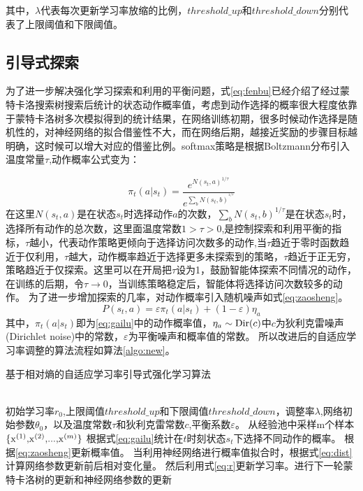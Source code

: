 其中，$\lambda$代表每次更新学习率放缩的比例，$threshold\_up$和$threshold\_down$分别代表了上限阈值和下限阈值。

\subsection{引导式探索}

为了进一步解决强化学习探索和利用的平衡问题，式\ref{eq:fenbu}已经介绍了经过蒙特卡洛搜索树搜索后统计的状态动作概率值，考虑到动作选择的概率很大程度依靠于蒙特卡洛树多次模拟得到的统计结果，在网络训练初期，很多时候动作选择是随机性的，对神经网络的拟合借鉴性不大，而在网络后期，越接近奖励的步骤目标越明确，这时候可以增大对应的借鉴比例。softmax策略是根据Boltzmann分布引入温度常量$\tau $,动作概率公式变为：

\begin{equation}
\label{eq:gailu}
{\pi _t}(a|{s_t}) = \frac{{{e^{N{{({s_t},a)}^{1/\tau }}}}}}{{{e^{\sum\nolimits_b {N{{({s_t},b)}^{^{1/\tau }}}} }}}}
\end{equation}
在这里${N({s_t},a)}$是在状态$s_t$时选择动作$a$的次数，${\sum\nolimits_b {N{{({s_t},b)}^{1/\tau }}} }$是在状态$s_t$时，选择所有动作的总次数，这里面温度常数$1>\tau>0$,是控制探索和利用平衡的指标，$\tau$越小，代表动作策略更倾向于选择访问次数多的动作,当$\tau$趋近于零时函数趋近于仅利用，$\tau$越大，动作概率趋近于选择更多未探索到的策略，$\tau$趋近于正无穷，策略趋近于仅探索。这里可以在开局把$\tau$设为1，鼓励智能体探索不同情况的动作，在训练的后期，令$\tau  \to 0$，当训练策略稳定后，智能体将选择访问次数较多的动作。
为了进一步增加探索的几率，对动作概率引入随机噪声如式\ref{eq:zaosheng}。
\begin{equation}
\label{eq:zaosheng}
	P({s_t},a) = \varepsilon{\pi _t}(a|{s_t}) + (1-\varepsilon) {\eta _a}
\end{equation}
其中，${\pi _t}(a|{s_t})$即为\ref{eq:gailu}中的动作概率值，${\eta _a} \sim {\rm{Dir}}(c)$中$c$为狄利克雷噪声(Dirichlet noise)中的常数，$\varepsilon$为平衡噪声和概率值的常数。
所以改进后的自适应学习率调整的算法流程如算法\ref{algo:new}。
\begin{algorithm}[htpb]
	\caption{基于相对熵的自适应学习率引导式强化学习算法}%
	\label{algo:new}
	\begin{algorithmic}[1]
		\Require ~~ \\
		初始学习率$r_0$,上限阈值$threshold\_up$和下限阈值$threshold\_down$，调整率$\lambda$,网络初始参数$\theta_0$，以及温度常数$\tau$和狄利克雷常数$c$,平衡系数$\varepsilon $。
		\State 从经验池中采样m个样本${\rm{\{ }}{{\rm{x}}^{(1)}}{\rm{,}}{{\rm{x}}^{(2)}}{\rm{,}}...{\rm{,}}{{\rm{x}}^{(m)}}{\rm{\} }}$
		\State 根据式\ref{eq:gailu}统计在$t$时刻状态$s_t$下选择不同动作的概率。
		\State 根据\ref{eq:zaosheng}更新概率值。
		\State 当利用神经网络进行概率值拟合时，根据式\ref{eq:dist}计算网络参数更新前后相对变化量。
		\State 然后利用式\ref{eq:r}更新学习率。进行下一轮蒙特卡洛树的更新和神经网络参数的更新
		\EndWhile
	\end{algorithmic}
\end{algorithm}

